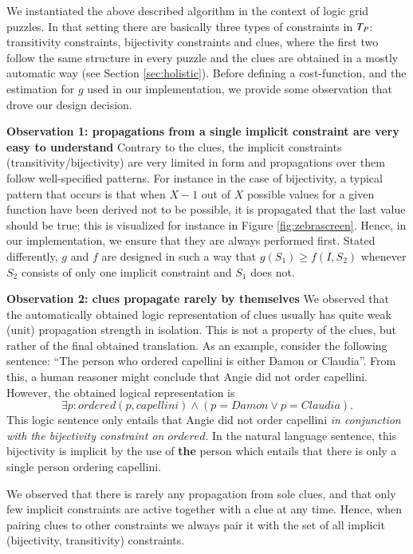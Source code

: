 We instantiated the above described algorithm in the context of logic grid puzzles. 
In that setting there are basically three types of constraints in $T_P$: transitivity constraints, bijectivity constraints and clues, where the first two follow the same structure in every puzzle and the clues are obtained in a mostly automatic way (see Section \ref{sec:holistic}). 
Before defining a cost-function, and the estimation for $g$ used in our implementation, we provide some observation that drove our design decision. 

\textbf{Observation 1: propagations from a single implicit constraint are very easy to understand} Contrary to the clues, the implicit constraints (transitivity/bijectivity) are very limited in form and propagations over them follow well-specified patterns. 
For instance in the case of bijectivity, a typical pattern that occurs is that when $X-1$ out of $X$ possible values for a given function have been derived not to be possible, it is propagated that the last value should be true; this is visualized for instance in Figure \ref{fig:zebrascreen}. 
Hence, in our implementation, we ensure that they are always performed first. Stated differently, $g$ and $f$ are designed in such a way that $g(S_1)\geq f(I,S_2)$ whenever $S_2$ consists of only one implicit constraint and $S_1$ does not. 

\textbf{Observation 2: clues propagate rarely by themselves}
We observed that the automatically obtained logic representation of clues usually has quite weak (unit) propagation strength in isolation. 
This is not a property of the clues, but rather of the final obtained translation. As an example, consider the following sentence: 
``The person who ordered capellini is either Damon or Claudia''. From this, a human reasoner might conclude that Angie did not order capellini. 
However, the obtained logical representation is 
\[\exists p: ordered(p,capellini)\land (p = Damon\lor p = Claudia).\]
This logic sentence only entails that Angie did not order capellini \emph{in conjunction with the bijectivity constraint on $ordered$}.
In the natural language sentence, this bijectivity is implicit by the use of \textbf{the} person which entails that there is only a single person ordering capellini. 

We observed that there is rarely any propagation from sole clues, and that only few implicit constraints are active together with a clue at any time. Hence, when pairing clues to other constraints we always pair it with the set of all implicit (bijectivity, transitivity) constraints.

